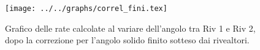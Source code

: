 \begin{figure}[h] \centering\texttt{[image: ../../graphs/correl\_fini.tex]}\caption{Grafico delle rate calcolate al variare dell'angolo tra Riv 1 e Riv 2, dopo la correzione per l'angolo solido finito sotteso dai rivealtori.}\label{gr:correl_fini} \end{figure}
